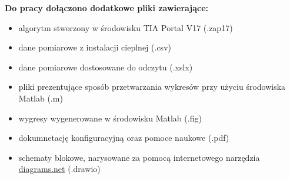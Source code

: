 \documentclass[a4paper,twoside,12pt]{book}
\begin{document}
\begin{appendices}
	\textbf{Do pracy dołączono dodatkowe pliki zawierające:}
	\begin{itemize}
		\item algorytm stworzony w środowisku TIA Portal V17 (.zap17)
		\item dane pomiarowe z instalacji cieplnej (.csv)
		\item dane pomiarowe dostosowane do odczytu (.xslx)
		\item pliki prezentujące sposób przetwarzania wykresów przy użyciu środowiska Matlab (.m)
		\item wygresy wygenerowane w środowisku Matlab (.fig)
		\item dokumnetację konfiguracyjną oraz pomoce naukowe (.pdf)
		\item schematy blokowe, narysowane za pomocą internetowego narzędzia \href{https://app.diagrams.net/}{diagrams.net} (.drawio)
	\end{itemize}

	\listoffigures
	\listoftables

\end{appendices}
\end{document}
